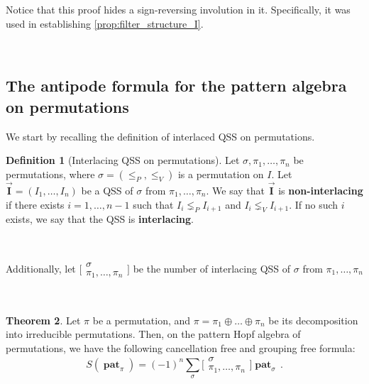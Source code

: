 \documentclass[12pt, reqno]{amsart}
\theoremstyle{definition}
\newtheorem{thm}{Theorem}[section]
\newtheorem{defin}[thm]{Definition}
\newcommand{\III}{\vec{\mathbf{I}}}
\DeclareMathOperator{\pat}{\mathbf{pat}}
\begin{document}
\



\

Notice that this proof hides a sign-reversing involution in it.
Specifically, it was used in establishing \cref{prop:filter_structure_I}.

\

\subsection{The antipode formula for the pattern algebra on permutations\label{sec:formula_permutation}}
We start by recalling the definition of interlaced QSS on permutations.

\begin{defin}[Interlacing QSS on permutations]
Let $\sigma, \pi_1, \dots, \pi_n$ be permutations, where $\sigma = (\leq_P, \leq_V)$ is a permutation on $I$.
Let $\III = (I_1, \dots, I_n)$ be a QSS of $\sigma$ from $\pi_1, \dots, \pi_n$.
We say that $\III$ is \textbf{non-interlacing} if there exists $i = 1, \dots, n-1$ such that $I_i \lneq_P I_{i+1}$ and $I_i \lneq_V I_{i+1}$.
If no such $i$ exists, we say that the QSS is \textbf{interlacing}.

\

Additionally, let 
$ \bigl[\!\begin{smallmatrix} \sigma \\ \pi_1, \dots, \pi_n \end{smallmatrix}\!\bigr]$ be the number of interlacing QSS of $\sigma$ from $\pi_1, \dots, \pi_n$
\end{defin}

\

\begin{thm}\label{thm:antipode_perms}
Let $\pi $ be a permutation, and $\pi = \pi_1 \oplus \dots \oplus \pi_n$ be its decomposition into irreducible permutations.
Then, on the pattern Hopf algebra of permutations, we have the following cancellation free and grouping free formula:
$$S(\pat_{\pi}) = (-1)^n \sum_{\sigma} \bigl[\!\begin{smallmatrix} \sigma \\ \pi_1, \dots, \pi_n \end{smallmatrix}\!\bigr] \pat_{\sigma} \, .$$
\end{thm}
\end{document}
